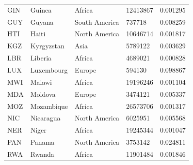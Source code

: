 \documentclass[11pt]{report}
\begin{document}
\begin{table}[h!]
\begin{tabular}{lllll}
            GIN                           & Guinea                    & Africa                         & 12413867                      & 0.001295                           \\
            GUY                           & Guyana                    & South America                  & 737718                        & 0.008259                           \\
            HTI                           & Haiti                     & North America                  & 10646714                      & 0.001817                           \\
            KGZ                           & Kyrgyzstan                & Asia                           & 5789122                       & 0.003629                           \\
            LBR                           & Liberia                   & Africa                         & 4689021                       & 0.000828                           \\
            LUX                           & Luxembourg                & Europe                         & 594130                        & 0.098867                           \\
            MWI                           & Malawi                    & Africa                         & 19196246                      & 0.001104                           \\
            MDA                           & Moldova                   & Europe                         & 3474121                       & 0.005337                           \\
            MOZ                           & Mozambique                & Africa                         & 26573706                      & 0.001317                           \\
            NIC                           & Nicaragua                 & North America                  & 6025951                       & 0.005568                           \\
            NER                           & Niger                     & Africa                         & 19245344                      & 0.001047                           \\
            PAN                           & Panama                    & North America                  & 3753142                       & 0.024811                           \\
            RWA                           & Rwanda                    & Africa                         & 11901484                      & 0.001846                           \\

\end{tabular}
\end{table}
\end{document}
